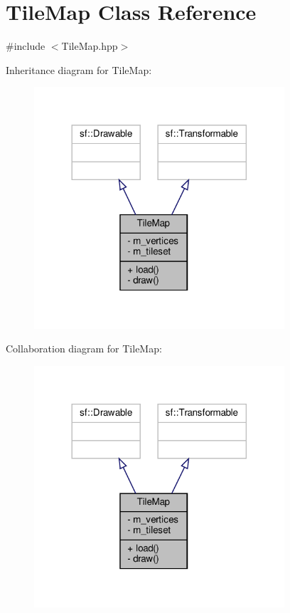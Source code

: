 \hypertarget{classTileMap}{}\section{Tile\+Map Class Reference}
\label{classTileMap}


{\ttfamily \#include $<$Tile\+Map.\+hpp$>$}



Inheritance diagram for Tile\+Map\+:
\nopagebreak
\begin{figure}[H]
\begin{center}
\leavevmode
\includegraphics[width=264pt]{classTileMap__inherit__graph}
\end{center}
\end{figure}


Collaboration diagram for Tile\+Map\+:
\nopagebreak
\begin{figure}[H]
\begin{center}
\leavevmode
\includegraphics[width=264pt]{classTileMap__coll__graph}
\end{center}
\end{figure}
